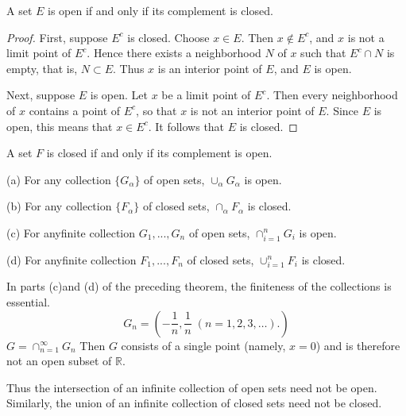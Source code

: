 \begin{thm}
    \label{thm:2.23}
    A set $E$ is open if and only if its complement is closed.
\end{thm}

\begin{proof}
    First, suppose $E^c$ is closed. Choose $x \in E$. Then $x \not\in E^c$, and $x$ is not a limit point of $E^c$. Hence there exists a neighborhood $N$ of $x$ such that $E^c \cap N$ is empty, that is, $N \subset E$. Thus $x$ is an interior point of $E$, and $E$ is open.
    
    Next, suppose $E$ is open. Let $x$ be a limit point of $E^c$. Then every neighborhood of $x$ contains a point of $E^c$, so that $x$ is not an interior point of $E$. Since $E$ is open, this means that $x \in E^c$. It follows that $E$ is closed.
\end{proof}

\begin{myCorollary}
    A set $F$ is closed if and only if its complement is open.
\end{myCorollary}


\begin{thm}
    \label{thm:2.24}
    (a) For any collection $\{G_\alpha\}$ of open sets,  $\cup_\alpha G_\alpha$ is open.

    (b) For any collection $\{F_\alpha\}$ of closed sets, $\cap_\alpha F_\alpha$ is closed.

    (c) For anyfinite collection $G_1, ..., G_n$ of open sets, $\cap_{i=1}^n G_i$ is open.

    (d) For anyfinite collection $F_1, ..., F_n$ of closed sets, $\cup_{i=1}^n F_i$ is closed.
\end{thm}


\begin{myExample}
    In parts (c)and (d) of the preceding theorem, the finiteness of the collections is essential.
    \begin{equation*}
        G_n = \left(-\frac{1}{n}, \frac{1}{n} \; (n=1,2,3,\dots). \right)
    \end{equation*}
    $G = \cap_{n=1}^\infty G_n$
    Then $G$ consists of a single point (namely, $x = 0$) and is therefore not an open subset of $\mathbb{R}$.
    
    Thus the intersection of an infinite collection of open sets need not be open. Similarly, the union of an infinite collection of closed sets need not be closed.
\end{myExample}

